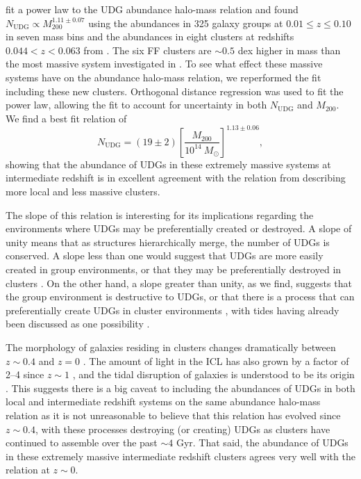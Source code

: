 \documentclass[iop,tighten,twocolumn,apj,floatfix]{emulateapj}
\begin{document}
\cite{vdb2017} fit a power law to the UDG abundance halo-mass relation and
found $N_\mathrm{UDG} \propto M_{200}^{1.11 \pm 0.07}$ using the abundances in
325 galaxy groups at $0.01 \leq z \leq 0.10$ in seven mass bins and the abundances
in eight clusters at redshifts $0.044 < z < 0.063$ from \cite{vdb2016}.
The six FF clusters are ${\sim}0.5$ dex higher in mass than the most massive
system investigated in \cite{vdb2016}.
To see what effect these massive systems have on the abundance halo-mass
relation, we reperformed the fit including these new clusters. 
Orthogonal distance regression was used to fit the power law, allowing the fit
to account for uncertainty in both $N_\mathrm{UDG}$ and $M_{200}$.
We find a best fit relation of
\begin{equation}
N_\mathrm{UDG} = (19 \pm 2) \left[\frac{M_{200}}{10^{14}~M_\odot}\right]^{1.13 \pm 0.06},
\end{equation}
showing that the abundance of UDGs in these extremely massive systems at
intermediate redshift is in excellent agreement with the relation from
\cite{vdb2017} describing more local and less massive clusters.

The slope of this relation is interesting for its implications regarding the
environments where UDGs may be preferentially created or destroyed.
A slope of unity means that as structures hierarchically merge, the number of
UDGs is conserved.
A slope less than one would suggest that UDGs are more easily created in group
environments, or that they may be preferentially destroyed in clusters
\citep{roman2017b}.
On the other hand, a slope greater than unity, as we find, suggests that
the group environment is destructive to UDGs, or that there is a process that
can preferentially create UDGs in cluster environments \citep{roman2017b,
vdb2017}, with tides having already been discussed as one possibility \citep{sales2019}.

The morphology of galaxies residing in clusters changes
dramatically between $z \sim 0.4$ and $z = 0$ \citetext{i.e.\ the
Butcher-Oemler effect, \citealp{butcher1978, butcher1984, dressler1994,
moore1998}}.
The amount of light in the ICL has also grown by a factor of 2--4 since
$z \sim 1$ \citep{burke2012}, and the tidal disruption of galaxies is
understood to be its origin \citep[e.g.][]{harris2017}.
This suggests there is a big caveat to including the abundances of UDGs in both local and
intermediate redshift systems on the same abundance halo-mass relation as it
is not unreasonable to believe that this relation has
evolved since $z \sim 0.4$, with these processes destroying (or creating) UDGs
as clusters have continued to assemble over the past ${\sim}4$ Gyr.
That said, the abundance of UDGs in these extremely massive intermediate redshift
clusters agrees very well with the relation at $z \sim 0$.
\end{document}
